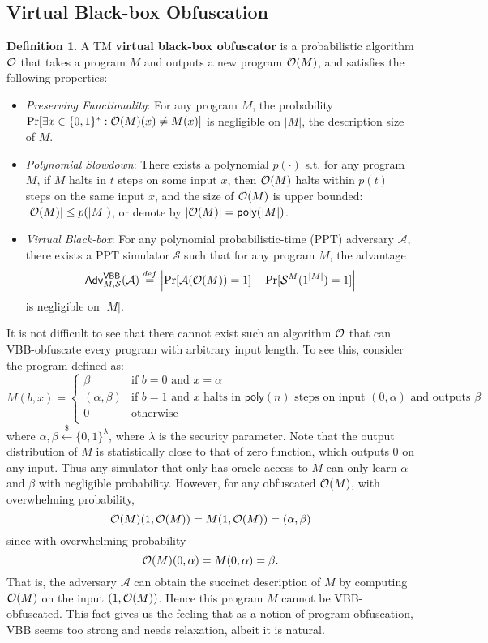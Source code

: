 \documentclass[12pt]{article}
\newcommand{\eqdef}{\stackrel{def}{=}}
\newcommand{\bits}{\{0,1\}}
\newcommand{\getsr}{\stackrel{\$}{\gets}}
\newcommand{\A}{\mathcal{A}}
\newcommand{\Sim}{\mathcal{S}}
\newcommand{\Adv}{\mathsf{Adv}}
\newcommand{\poly}{\mathsf{poly}}
\theoremstyle{definition}
\newtheorem{definition}[theorem]{Definition}
\begin{document}
\subsection{Virtual Black-box Obfuscation}
\begin{definition}
\label{def:vbb}
A TM {\bf virtual black-box obfuscator} is a probabilistic algorithm $\mathcal{O}$ that takes a program $M$ and outputs a new program $\mathcal{O}(M)$, and satisfies the following properties:
\begin{itemize}
\item \emph{Preserving Functionality}: For any program $M$, the probability
$\Pr[\exists x \in \bits^* : \bigoh(M)(x) \not= M(x)]$
is negligible on $|M|$, the description size of $M$.
\item \emph{Polynomial Slowdown}: There exists a polynomial $p(\cdot)$ s.t. for any program $M$, if $M$ halts in $t$ steps on some input $x$, then $\mathcal{O}(M)$ halts within $p(t)$ steps on the same input $x$, and the size of $\mathcal{O}(M)$ is upper bounded: $|\mathcal{O}(M)| \leq p(|M|)$, or denote by $|\bigoh(M)| = \poly(|M|)$.
\item \emph{Virtual Black-box}: For any polynomial probabilistic-time (PPT) adversary $\A$, there exists a PPT simulator $\Sim$ such that for any program $M$, the advantage 
$$\Adv_{M,\Sim}^{\VBB}(\A) \eqdef \left| \Pr[\A(\bigoh(M)) = 1] - \Pr[\Sim^{M}(1^{|M|}) = 1] \right|$$
is negligible on $|M|$.
\end{itemize}
\end{definition}

It is not difficult to see that there cannot exist such an algorithm $\mathcal{O}$ that can VBB-obfuscate every program with arbitrary input length. To see this, consider the program defined as:
$$M(b,x) = 
\begin{cases}
\beta & \textrm{if $b=0$ and $x=\alpha$} \\
(\alpha, \beta) & \textrm{if $b=1$ and $x$ halts in $\poly(n)$ steps on input $(0,\alpha)$ and outputs $\beta$} \\
0 & \textrm{otherwise} \\
\end{cases}$$
where $\alpha, \beta \getsr \bits^\lambda$, where $\lambda$ is the security parameter.
Note that the output distribution of $M$ is statistically close to that of zero function, which outputs 0 on any input. Thus any simulator that only has oracle access to $M$ can only learn $\alpha$ and $\beta$ with negligible probability. However, for any obfuscated $\mathcal{O}(M)$, with overwhelming probability,
$$\mathcal{O}(M)(1, \mathcal{O}(M)) = M(1, \mathcal{O}(M)) = (\alpha, \beta)$$
since with overwhelming probability
$$\mathcal{O}(M)(0,\alpha) = M(0,\alpha) = \beta.$$ 
That is, the adversary $\A$ can obtain the succinct description of $M$ by computing $\mathcal{O}(M)$ on the input $(1, \mathcal{O}(M))$. Hence this program $M$ cannot be VBB-obfuscated. This fact gives us the feeling that as a notion of program obfuscation, VBB seems too strong and needs relaxation, albeit it is natural.
\end{document}
